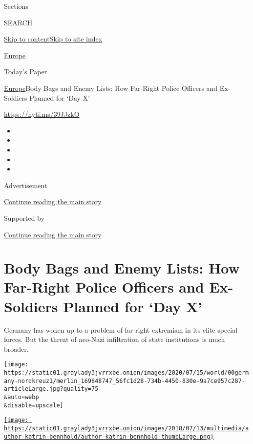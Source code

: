Sections

SEARCH

\protect\hyperlink{site-content}{Skip to
content}\protect\hyperlink{site-index}{Skip to site index}

\href{https://www.nytimes3xbfgragh.onion/section/world/europe}{Europe}

\href{https://myaccount.nytimes3xbfgragh.onion/auth/login?response_type=cookie\&client_id=vi}{}

\href{https://www.nytimes3xbfgragh.onion/section/todayspaper}{Today's
Paper}

\href{/section/world/europe}{Europe}\textbar{}Body Bags and Enemy Lists:
How Far-Right Police Officers and Ex-Soldiers Planned for `Day X'

\url{https://nyti.ms/39JJzkO}

\begin{itemize}
\item
\item
\item
\item
\item
\end{itemize}

Advertisement

\protect\hyperlink{after-top}{Continue reading the main story}

Supported by

\protect\hyperlink{after-sponsor}{Continue reading the main story}

\hypertarget{body-bags-and-enemy-lists-how-far-right-police-officers-and-ex-soldiers-planned-for-day-x}{%
\section{Body Bags and Enemy Lists: How Far-Right Police Officers and
Ex-Soldiers Planned for `Day
X'}\label{body-bags-and-enemy-lists-how-far-right-police-officers-and-ex-soldiers-planned-for-day-x}}

Germany has woken up to a problem of far-right extremism in its elite
special forces. But the threat of neo-Nazi infiltration of state
institutions is much broader.

\texttt{[image: https://static01.graylady3jvrrxbe.onion/images/2020/07/15/world/00germany-nordkreuz1/merlin\_169848747\_56fc1d28-734b-4450-830e-9a7ce957c287-articleLarge.jpg?quality=75\\\&auto=webp\\\&disable=upscale]}

\href{https://www.nytimes3xbfgragh.onion/by/katrin-bennhold}{\texttt{[image: https://static01.graylady3jvrrxbe.onion/images/2018/07/13/multimedia/author-katrin-bennhold/author-katrin-bennhold-thumbLarge.png]}}

